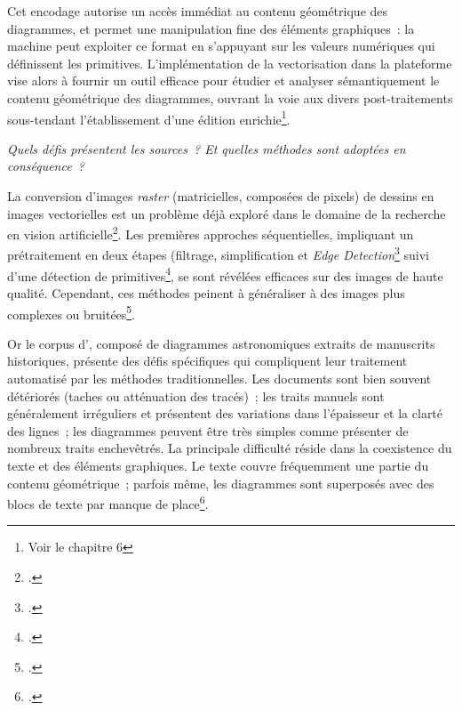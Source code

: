 Cet encodage autorise un accès immédiat au contenu géométrique des
diagrammes, et permet une manipulation fine des éléments graphiques~: la
machine peut exploiter ce format en s'appuyant sur les valeurs
numériques qui définissent les primitives. L'implémentation de la
vectorisation dans la plateforme vise alors à fournir un outil efficace
pour étudier et analyser sémantiquement le contenu géométrique des
diagrammes, ouvrant la voie aux divers post-traitements sous-tendant
l'établissement d'une édition enrichie\footnote{Voir le \hypertarget{chapitre-6-vers-edition}{chapitre 6}}.

\emph{Quels défis présentent les sources~? Et quelles méthodes sont
adoptées en conséquence~?}

La conversion d'images \textit{raster} (matricielles, composées de pixels) de
dessins en images vectorielles est un problème déjà exploré dans le
domaine de la recherche en vision artificielle\footcite{egiazarian_deep_2020}. Les
premières approches séquentielles, impliquant un prétraitement en deux
étapes (filtrage, simplification et \emph{Edge Detection}\footcite{canny_computational_1986} suivi d'une
détection de primitives\footcite{ref-noauthor_ransac_nodate}, se sont
révélées efficaces sur des images de haute qualité. Cependant, ces
méthodes peinent à généraliser à des images plus complexes ou
bruitées\footcite{hilaire_robust_2006}.

Or le corpus d'\eida, composé de diagrammes astronomiques extraits de
manuscrits historiques, présente des défis spécifiques qui compliquent
leur traitement automatisé par les méthodes traditionnelles. Les
documents sont bien souvent détériorés (taches ou atténuation des
tracés)~; les traits manuels sont généralement irréguliers et présentent
des variations dans l'épaisseur et la clarté des lignes~; les diagrammes
peuvent être très simples comme présenter de nombreux traits
enchevêtrés. La principale difficulté réside dans la coexistence du
texte et des éléments graphiques. Le texte couvre fréquemment une partie
du contenu géométrique~; parfois même, les diagrammes sont superposés
avec des blocs de texte par manque de place\footcite{kalleli_historical_2024}.


